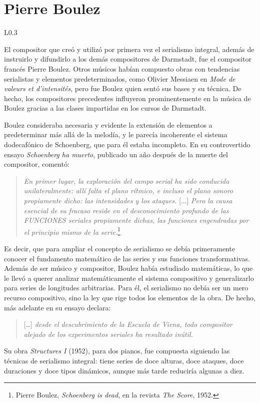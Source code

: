 	\section{Pierre Boulez}
	\label{boulez}
     \begin{wrapfigure}{L}{0.3\textwidth}
		\captionsetup{justification=centering, font=footnotesize}
		\vspace{-0.5cm}
	\end{wrapfigure}
    El compositor que creó y utilizó por primera vez el serialismo integral, además de instruirlo y difundirlo a los demás compositores de Darmstadt, fue el compositor francés Pierre Boulez. Otros músicos habían compuesto obras con tendencias serialistas y elementos predeterminados, como Olivier Messiaen en \emph{Mode de valeurs et d’intensités}, pero fue Boulez quien sentó sus bases y su técnica. De hecho, los compositores precedentes influyeron prominentemente en la música de Boulez gracias a las clases impartidas en los cursos de Darmstadt.
    
    Boulez consideraba necesaria y evidente la extensión de elementos a predeterminar más allá de la melodía, y le parecía incoherente el sistema dodecafónico de Schoenberg, que para él estaba incompleto. En su controvertido ensayo \emph{Schoenberg ha muerto}, publicado un año después de la muerte del compositor, comentó:
    
    \begin{quote}\emph{En primer lugar, la exploración del campo serial ha sido conducida unilateralmente: allí falta el plano rítmico, e incluso el plano sonoro propiamente dicho: las intensidades y los ataques.} [$\ldots$] \emph{Pero la causa esencial de su fracaso reside en el desconocimiento profundo de las FUNCIONES seriales propiamente dichas, las funciones engendradas por el principio mismo de la serie.}\footnote{Pierre Boulez, \emph{Schoenberg is dead}, en la revista \emph{The Score}, 1952.}\end{quote}
    
   Es decir, que para ampliar el concepto de serialismo se debía primeramente conocer el fundamento matemático de las series y sus funciones transformativas. Además de ser músico y compositor, Boulez había estudiado matemáticas, lo que le llevó a querer analizar matemáticamente el sistema compositivo y generalizarlo para series de longitudes arbitrarias. Para él, el serialismo no debía ser un mero recurso compositivo, sino la ley que rige todos los elementos de la obra. De hecho, más adelante en su ensayo declara:
    
    \begin{quote}[\ldots] \emph{desde el descubrimiento de la Escuela de Viena, todo compositor alejado de los experimentos seriales ha resultado inútil.}\end{quote}

	Su obra \emph{Structures I} (1952), para dos pianos, fue compuesta siguiendo las técnicas de serialismo integral: tiene series de doce alturas, doce ataques, doce duraciones y
doce tipos dinámicos, aunque más tarde reduciría algunas a diez.